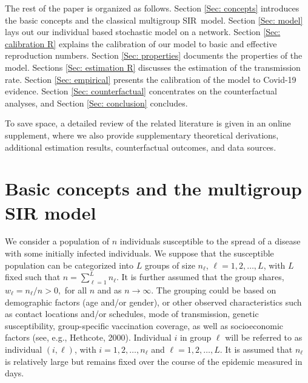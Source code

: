 \documentclass[12pt]{article}
\begin{document}
The rest of the paper is organized as follows. Section \ref{Sec: concepts}
introduces the basic concepts and the classical multigroup SIR\ model. Section
\ref{Sec: model} lays out our individual based stochastic model on a network.
Section \ref{Sec: calibration R} explains the calibration of our model to
basic and effective reproduction numbers. Section \ref{Sec: properties}
documents the properties of the model. Sections \ref{Sec: estimation R}
discusses the estimation of the transmission rate. Section
\ref{Sec: empirical} presents the calibration of the model to Covid-19
evidence. Section \ref{Sec: counterfactual} concentrates on the counterfactual
analyses, and Section \ref{Sec: conclusion} concludes.

To save space, a detailed review of the related literature is given in an
online supplement, where we also provide supplementary theoretical
derivations, additional estimation results, counterfactual outcomes, and data sources.

\section{Basic concepts and the multigroup SIR model\label{Sec: concepts}}

We consider a population of $n$ individuals susceptible to the spread of a
disease with some initially infected individuals. We suppose that the
susceptible population can be categorized into $L$ groups of size $n_{\ell}$,
$\ell=1,2,\ldots,L$, with $L$ fixed such that $n=\sum_{\ell=1}^{L}n_{\ell}$.
It is further assumed that the group shares, $w_{\ell}=n_{\ell}/n>0,$ for all
$n$ and as $n\rightarrow\infty$. The grouping could be based on demographic
factors (age and/or gender), or other observed characteristics such as contact
locations and/or schedules, mode of transmission, genetic susceptibility,
group-specific vaccination coverage, as well as socioeconomic factors (see,
e.g., Hethcote, 2000). Individual $i$ in group $\ell$ will be referred to as
individual $\left(  i,\ell\right)  $, with $i=1,2,\ldots,n_{\ell}$ and
$\ell=1,2,\ldots,L$. It is assumed that $n_{\ell}$ is relatively large but
remains fixed over the course of the epidemic measured in days.
\end{document}
